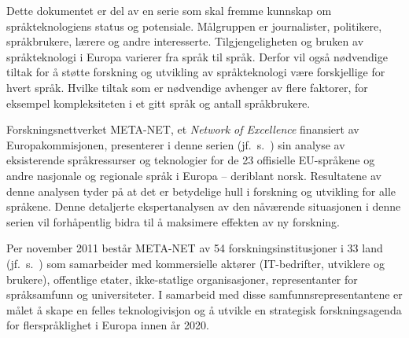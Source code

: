 Dette dokumentet er del av en serie som skal fremme kunnskap om språkteknologiens status og potensiale. Målgruppen er journalister, politikere, språkbrukere, lærere og andre interesserte. Tilgjengeligheten og bruken av språkteknologi i Europa varierer fra språk til språk. Derfor vil også nødvendige tiltak for å støtte forskning og utvikling av språkteknologi være forskjellige for hvert språk. Hvilke tiltak som er nødvendige avhenger av flere faktorer, for eksempel kompleksiteten i et gitt språk og antall språkbrukere.

Forskningsnettverket META-NET, et \emph{Network of Excellence} finansiert av Europakommisjonen, presenterer i denne serien  (jf.~s.~\pageref{whitepaperseries}) sin analyse av eksisterende språkressurser og teknologier for de 23 offisielle EU-språkene og andre nasjonale og regionale språk i Europa -- deriblant norsk. Resultatene av denne analysen tyder på at det er betydelige hull i forskning og utvikling for alle språkene. Denne detaljerte ekspertanalysen av den nåværende situasjonen i denne serien vil forhåpentlig bidra til å maksimere effekten av ny forskning.

Per november 2011 består META-NET av 54 forskningsinstitusjoner i 33 land (jf.~s.~\pageref{metanetmembers}) som samarbeider med kommersielle aktører (IT-bedrifter, utviklere og brukere), offentlige etater, ikke-statlige organisasjoner, representanter for språksamfunn og universiteter. I samarbeid med disse samfunnsrepresentantene er målet å skape en felles teknologivisjon og å utvikle en strategisk forskningsagenda for flerspråklighet i Europa innen år 2020.